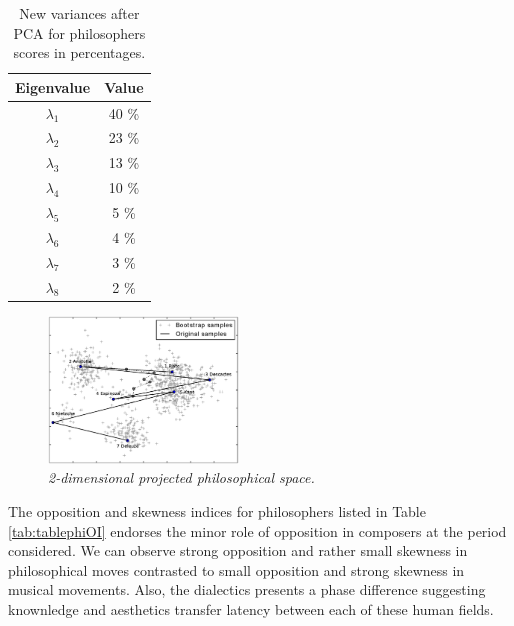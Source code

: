 \documentclass[
 aip,
 jmp,
 amsmath,amssymb,
 reprint,
]{revtex4-1}
\begin{document}
\begin{table}[ht]
\caption{\label{tab:varphi}New variances after PCA for philosophers
  scores in percentages.}

\begin{tabular}{|c||c|}
\hline
Eigenvalue  & Value     \\ \hline

$\lambda_1$ &  40 \% \\
$\lambda_2$ &  23 \% \\
$\lambda_3$ &  13 \% \\
$\lambda_4$ &  10 \% \\
$\lambda_5$ &   5 \% \\
$\lambda_6$ &   4 \% \\
$\lambda_7$ &   3 \% \\
$\lambda_8$ &   2 \% \\
\hline

\end{tabular}
\end{table}

\begin{figure}
  \begin{center}
    \includegraphics[width=0.45\textwidth]{g1filosofos}
  \end{center}
  \caption{\it 2-dimensional projected philosophical space.}
  \label{fig:phipca}
\end{figure}

The opposition and skewness indices for philosophers listed in Table
\ref{tab:tablephiOI} endorses the minor role of opposition in
composers at the period considered. We can observe strong opposition and rather small skewness 
in philosophical moves contrasted to small opposition and strong skewness in
musical movements. Also, the dialectics presents a
phase difference suggesting knownledge and aesthetics 
transfer latency between each of these human fields.
\end{document}
